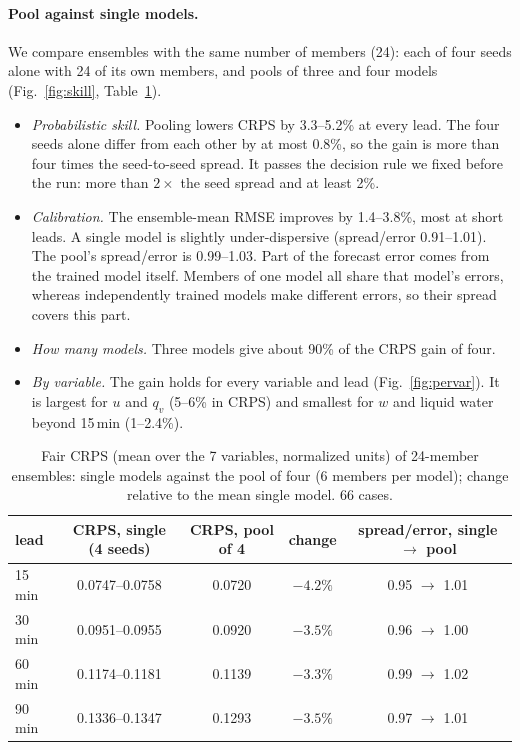 \documentclass[11pt]{article}
\begin{document}
\paragraph{Pool against single models.} We compare ensembles with the same number of members (24): each of four seeds alone with 24 of its own members, and pools of three and four models (Fig.~\ref{fig:skill}, Table~\ref{tab:pool}).
\begin{itemize}
\item \emph{Probabilistic skill.} Pooling lowers CRPS by 3.3--5.2\% at every lead. The four seeds alone differ from each other by at most 0.8\%, so the gain is more than four times the seed-to-seed spread. It passes the decision rule we fixed before the run: more than $2\times$ the seed spread and at least 2\%.
\item \emph{Calibration.} The ensemble-mean RMSE improves by 1.4--3.8\%, most at short leads. A single model is slightly under-dispersive (spread/error 0.91--1.01). The pool's spread/error is 0.99--1.03. Part of the forecast error comes from the trained model itself. Members of one model all share that model's errors, whereas independently trained models make different errors, so their spread covers this part.
\item \emph{How many models.} Three models give about 90\% of the CRPS gain of four.
\item \emph{By variable.} The gain holds for every variable and lead (Fig.~\ref{fig:pervar}). It is largest for $u$ and $q_v$ (5--6\% in CRPS) and smallest for $w$ and liquid water beyond 15\,min (1--2.4\%).
\end{itemize}

\begin{table}[h]
\centering\small
\begin{tabular}{lcccc}
\toprule
lead & CRPS, single (4 seeds) & CRPS, pool of 4 & change & spread/error, single $\to$ pool \\
\midrule
15\,min & 0.0747--0.0758 & 0.0720 & $-4.2\%$ & 0.95 $\to$ 1.01 \\
30\,min & 0.0951--0.0955 & 0.0920 & $-3.5\%$ & 0.96 $\to$ 1.00 \\
60\,min & 0.1174--0.1181 & 0.1139 & $-3.3\%$ & 0.99 $\to$ 1.02 \\
90\,min & 0.1336--0.1347 & 0.1293 & $-3.5\%$ & 0.97 $\to$ 1.01 \\
\bottomrule
\end{tabular}
\caption{Fair CRPS (mean over the 7 variables, normalized units) of 24-member ensembles: single models against the pool of four (6 members per model); change relative to the mean single model. 66 cases.}
\label{tab:pool}
\end{table}
\end{document}
